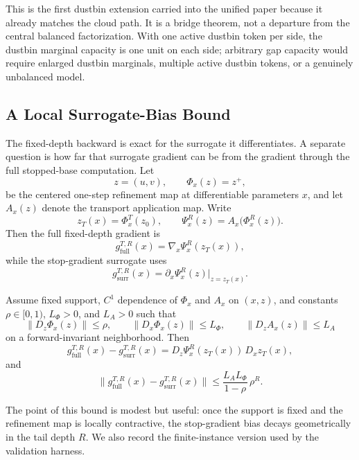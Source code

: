 This is the first dustbin extension carried into the unified paper because it already matches the cloud path. It is a bridge theorem, not a departure from the central balanced factorization. With one active dustbin token per side, the dustbin marginal capacity is one unit on each side; arbitrary gap capacity would require enlarged dustbin marginals, multiple active dustbin tokens, or a genuinely unbalanced model.

\subsection{A Local Surrogate-Bias Bound}

The fixed-depth backward is exact for the surrogate it differentiates. A separate question is how far that surrogate gradient can be from the gradient through the full stopped-base computation. Let
\[
z=(u,v),\qquad \Phi_x(z)=z^+,
\]
be the centered one-step refinement map at differentiable parameters $x$, and let $A_x(z)$ denote the transport application map. Write
\[
z_T(x)=\Phi_x^T(z_0),
\qquad
\Psi_x^R(z)=A_x\!\bigl(\Phi_x^R(z)\bigr).
\]
Then the full fixed-depth gradient is
\[
g_{\mathrm{full}}^{T,R}(x)=\nabla_x \Psi_x^R(z_T(x)),
\]
while the stop-gradient surrogate uses
\[
g_{\mathrm{surr}}^{T,R}(x)=\partial_x \Psi_x^R(z)\big|_{z=z_T(x)}.
\]

\begin{theorem}\label{thm:surrogate_bias}
Assume fixed support, $C^1$ dependence of $\Phi_x$ and $A_x$ on $(x,z)$, and constants $\rho\in[0,1)$, $L_\Phi>0$, and $L_A>0$ such that
\[
\|D_z\Phi_x(z)\|\le\rho,
\qquad
\|D_x\Phi_x(z)\|\le L_\Phi,
\qquad
\|D_z A_x(z)\|\le L_A
\]
on a forward-invariant neighborhood. Then
\[
g_{\mathrm{full}}^{T,R}(x)-g_{\mathrm{surr}}^{T,R}(x)
=
D_z\Psi_x^R(z_T(x))\,D_x z_T(x),
\]
and
\[
\bigl\|g_{\mathrm{full}}^{T,R}(x)-g_{\mathrm{surr}}^{T,R}(x)\bigr\|
\le
\frac{L_A L_\Phi}{1-\rho}\,\rho^R.
\]
\end{theorem}

The point of this bound is modest but useful: once the support is fixed and the refinement map is locally contractive, the stop-gradient bias decays geometrically in the tail depth $R$. We also record the finite-instance version used by the validation harness.

